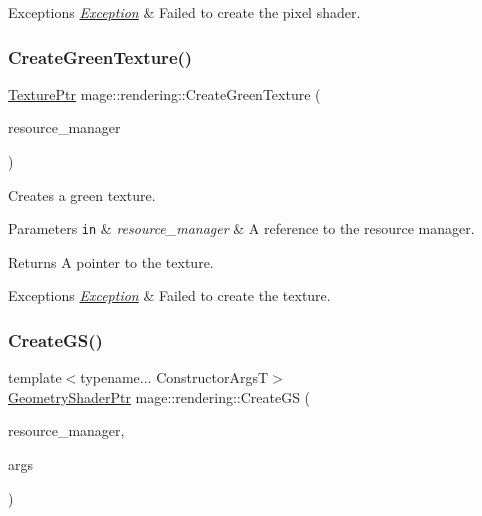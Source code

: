 \begin{DoxyExceptions}{Exceptions}
{\em \mbox{\hyperlink{classmage_1_1_exception}{Exception}}} & Failed to create the pixel shader. \\
\hline
\end{DoxyExceptions}
\mbox{\label{namespacemage_1_1rendering_acb78520fc876356259d3b58d403d4d27}} 
\subsubsection{\texorpdfstring{Create\+Green\+Texture()}{CreateGreenTexture()}}
{\footnotesize\ttfamily \mbox{\hyperlink{namespacemage_1_1rendering_a6f3ae54f825328465b0cdde0f0de4a36}{Texture\+Ptr}} mage\+::rendering\+::\+Create\+Green\+Texture (\begin{DoxyParamCaption}\item[{\mbox{\hyperlink{classmage_1_1rendering_1_1_resource_manager}{Resource\+Manager}} \&}]{resource\+\_\+manager }\end{DoxyParamCaption})}

Creates a green texture.


\begin{DoxyParams}[1]{Parameters}
\mbox{\tt in}  & {\em resource\+\_\+manager} & A reference to the resource manager. \\
\hline
\end{DoxyParams}
\begin{DoxyReturn}{Returns}
A pointer to the texture. 
\end{DoxyReturn}

\begin{DoxyExceptions}{Exceptions}
{\em \mbox{\hyperlink{classmage_1_1_exception}{Exception}}} & Failed to create the texture. \\
\hline
\end{DoxyExceptions}
\mbox{\label{namespacemage_1_1rendering_a36f39020d369b72c6db0497ff4f6fc72}} 
\subsubsection{\texorpdfstring{Create\+G\+S()}{CreateGS()}}
{\footnotesize\ttfamily template$<$typename... Constructor\+ArgsT$>$ \\
\mbox{\hyperlink{namespacemage_1_1rendering_aa5d63f80f9483d0896718813768ba1cf}{Geometry\+Shader\+Ptr}} mage\+::rendering\+::\+Create\+GS (\begin{DoxyParamCaption}\item[{\mbox{\hyperlink{classmage_1_1rendering_1_1_resource_manager}{Resource\+Manager}} \&}]{resource\+\_\+manager,  }\item[{Constructor\+ArgsT \&\&...}]{args }\end{DoxyParamCaption})}

